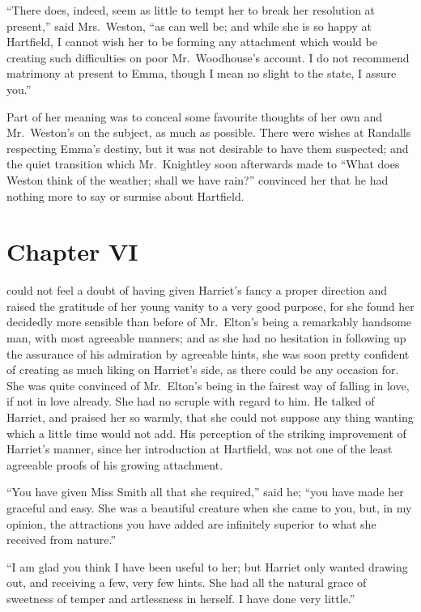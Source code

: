 ``There does, indeed, seem as little to tempt her to break
her resolution at present,'' said Mrs.\ Weston, ``as can well be;
and while she is so happy at Hartfield, I cannot wish her to be
forming any attachment which would be creating such difficulties
on poor Mr.\ Woodhouse's account.  I do not recommend matrimony
at present to Emma, though I mean no slight to the state, I assure you.''

Part of her meaning was to conceal some favourite thoughts of
her own and Mr.\ Weston's on the subject, as much as possible.
There were wishes at Randalls respecting Emma's destiny, but it
was not desirable to have them suspected; and the quiet transition
which Mr.\ Knightley soon afterwards made to ``What does Weston
think of the weather; shall we have rain?'' convinced her that he
had nothing more to say or surmise about Hartfield.



\chapter{Chapter VI}


 could not feel a doubt of having given Harriet's fancy
a proper direction and raised the gratitude of her young vanity
to a very good purpose, for she found her decidedly more sensible
than before of Mr.\ Elton's being a remarkably handsome man, with most
agreeable manners; and as she had no hesitation in following up
the assurance of his admiration by agreeable hints, she was soon
pretty confident of creating as much liking on Harriet's side,
as there could be any occasion for.  She was quite convinced
of Mr.\ Elton's being in the fairest way of falling in love,
if not in love already.  She had no scruple with regard to him.
He talked of Harriet, and praised her so warmly, that she could
not suppose any thing wanting which a little time would not add.
His perception of the striking improvement of Harriet's manner,
since her introduction at Hartfield, was not one of the least
agreeable proofs of his growing attachment.

``You have given Miss Smith all that she required,'' said he;
``you have made her graceful and easy.  She was a beautiful creature
when she came to you, but, in my opinion, the attractions you have
added are infinitely superior to what she received from nature.''

``I am glad you think I have been useful to her; but Harriet
only wanted drawing out, and receiving a few, very few hints.
She had all the natural grace of sweetness of temper and artlessness
in herself.  I have done very little.''

